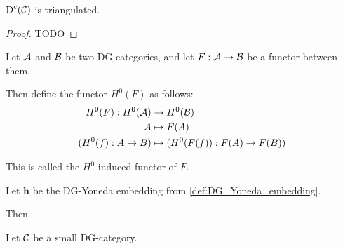 \begin{proposition}
    \( \operatorname{D}^c({\mathcal{C}}) \) is triangulated.
\end{proposition}
\begin{proof}
    TODO
\end{proof}

\begin{definition}
    \label{def:H^0-induced_functor}
    Let \( {\mathcal{A}} \) and \( {\mathcal{B}} \) be two DG-categories, and let \( F: {\mathcal{A}} \to {\mathcal{B}} \) be a functor between them.

    Then define the functor \( H^0(F) \) as follows:
    \begin{align*}
        H^0(F): H^0({\mathcal{A}}) &\to H^0({\mathcal{B}}) \\
        A &\mapsto F(A) \\
        (H^0(f): A \to B) &\mapsto (H^0(F(f)): F(A) \to F(B)) 
    \end{align*}

    This is called the \( H^0 \)-induced functor of \( F \).
\end{definition}

\begin{remark}
    Let \( \mathbf{h} \) be the DG-Yoneda embedding from \autoref{def:DG_Yoneda_embedding}.

    Then 

\end{remark}

\begin{definition}
    Let \( {\mathcal{C}} \) be a small DG-category.
\end{definition}